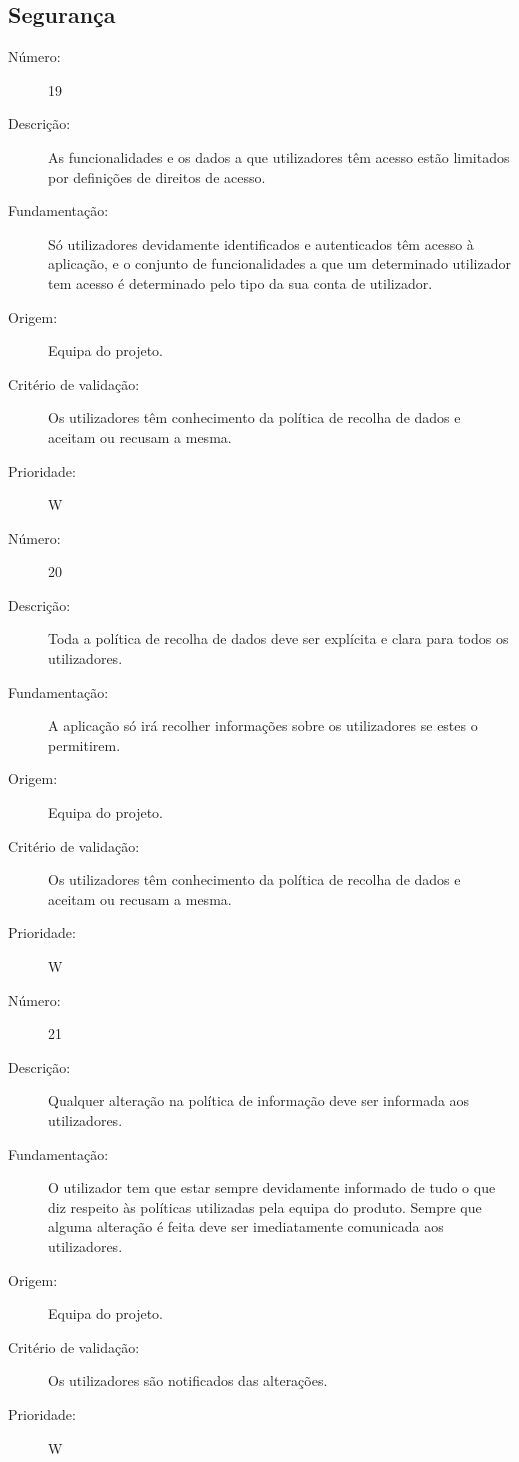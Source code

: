 \documentclass[12pt,a4paper]{article}
\begin{document}
  \subsection{Segurança}

            \begin{description}
        \item[Número:]19
        \item[Descrição:]As funcionalidades e os dados a que utilizadores têm acesso estão limitados por definições de direitos de acesso.
        \item[Fundamentação:]Só utilizadores devidamente identificados e autenticados têm acesso à aplicação, e o conjunto de funcionalidades a que um determinado utilizador tem acesso é determinado pelo tipo da sua conta de utilizador.
        \item[Origem:]Equipa do projeto.
        \item[Critério de validação:]Os utilizadores têm conhecimento da política de recolha de dados e aceitam ou recusam a mesma.
        \item[Prioridade:]W
      \end{description}
      \vspace{0.5cm}

            \begin{description}
        \item[Número:]20
        \item[Descrição:]Toda a política de recolha de dados deve ser explícita e clara para todos os utilizadores.
        \item[Fundamentação:]A aplicação só irá recolher informações sobre os utilizadores se estes o permitirem.
        \item[Origem:]Equipa do projeto.
        \item[Critério de validação:]Os utilizadores têm conhecimento da política de recolha de dados e aceitam ou recusam a mesma.
        \item[Prioridade:]W
      \end{description}
      \vspace{0.5cm}

            \begin{description}
        \item[Número:]21
        \item[Descrição:]Qualquer alteração na política de informação deve ser informada aos utilizadores. 
        \item[Fundamentação:]O utilizador tem que estar sempre devidamente informado de tudo o que diz respeito às políticas utilizadas pela equipa do produto. Sempre que alguma alteração é feita deve ser imediatamente comunicada aos utilizadores.
        \item[Origem:] Equipa do projeto.
        \item[Critério de validação:]Os utilizadores são notificados das alterações.
        \item[Prioridade:]W
      \end{description}
      \vspace{0.5cm}
\end{document}
